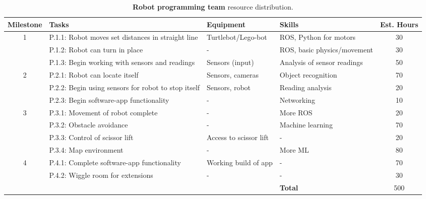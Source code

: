 \documentclass{article}
\begin{document}
\begin{table*}[]
  \begin{center}
  \begin{small}
  \begin{tabular}{|c|l|l|l|c|}
    \hline
    {\bf Milestone} & {\bf Tasks} & {\bf Equipment} & {\bf Skills} & {\bf Est. Hours} \\ \hline
    1               & P.1.1: Robot moves set distances in straight line & Turtlebot/Lego-bot & ROS, Python for motors & 30\\ \cline{2-5}
                    & P.1.2: Robot can turn in place & - & ROS, basic physics/movement & 30\\ \cline{2-5}
                    & P.1.3: Begin working with sensors and readings & Sensors (input) & Analysis of sensor readings & 50 \\ \hline
    2               & P.2.1: Robot can locate itself & Sensors, cameras & Object recognition & 70\\ \cline{2-5}
                    & P.2.2: Begin using sensors for robot to stop itself & Sensors, robot & Reading analysis & 20\\ \cline{2-5}
                    & P.2.3: Begin software-app functionality & - & Networking & 10\\ \hline
    3               & P.3.1: Movement of robot complete & - & More ROS & 20\\ \cline{2-5}
                    & P.3.2: Obstacle avoidance & - & Machine learning & 70\\ \cline{2-5}
                    & P.3.3: Control of scissor lift & Access to scissor lift & - & 20\\ \cline{2-5}
                    & P.3.4: Map environment & - & More ML & 80\\ \hline
    4               & P.4.1: Complete software-app functionality & Working build of app & - & 70\\ \cline{2-5}
                    & P.4.2: Wiggle room for extensions & - & - & 30\\ \hline
                    &  &  & {\bf Total} & 500 \\ \hline
  \end{tabular}
  \end{small}
  \caption{{\bf Robot programming team} resource distribution.}
  \label{tab:rp-rd}
  \end{center}
\end{table*}
\end{document}
